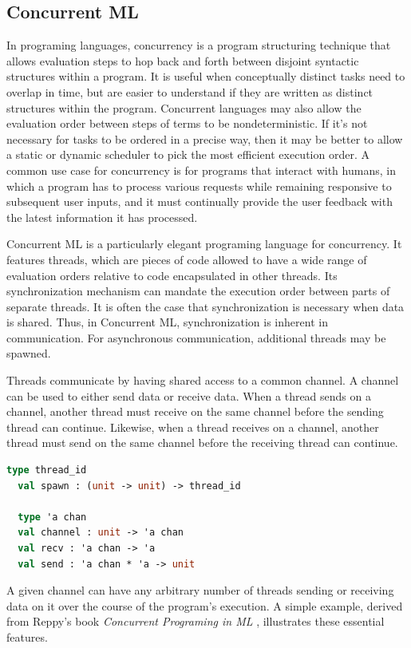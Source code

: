 \documentclass[letterpaper, 11pt]{report}
\begin{document}
\subsection{Concurrent ML}
In programing languages, concurrency is a program structuring technique that allows evaluation
steps to hop back and forth between disjoint syntactic structures within a program.
It is useful
when conceptually distinct tasks need to overlap in time, but are easier to understand if they
are written as distinct structures within the program. Concurrent languages may also allow the
evaluation order between steps of terms to be nondeterministic. If it's not necessary for
tasks to be ordered in a precise way, then it may be better to allow a static or dynamic
scheduler to pick the most efficient execution order. A common use case for concurrency
is for programs that interact with humans, in which a program has to process various requests
while remaining responsive to subsequent user inputs, and it must continually provide the user
feedback with the latest information it has processed.

Concurrent ML is a particularly elegant programing language for concurrency.
It features threads, which are pieces of code allowed to have a wide range of
evaluation orders relative to code encapsulated in other threads. Its synchronization
mechanism can mandate the execution order between parts of separate threads. It is often the
case that synchronization is necessary when data is shared. Thus, in Concurrent ML,
synchronization is inherent in communication. For asynchronous communication, additional threads may be spawned.

Threads communicate by having shared access to a common channel. A channel can be used to
either send data or receive data. When a thread sends on a channel, another thread must
receive on the same channel before the sending thread can continue. Likewise, when a thread
receives on a channel, another thread must send on the same channel before the receiving thread
can continue.

\begin{lstlisting}[language=ML]
  type thread_id
  val spawn : (unit -> unit) -> thread_id

  type 'a chan
  val channel : unit -> 'a chan
  val recv : 'a chan -> 'a
  val send : 'a chan * 'a -> unit
  \end{lstlisting}

A given channel can have any arbitrary number of threads sending or receiving data on it over
the course of the program's execution. A simple example, derived from Reppy's book
\textit{Concurrent Programing in ML} \cite{reppy2007concurrent}, illustrates these essential
features.
\end{document}
